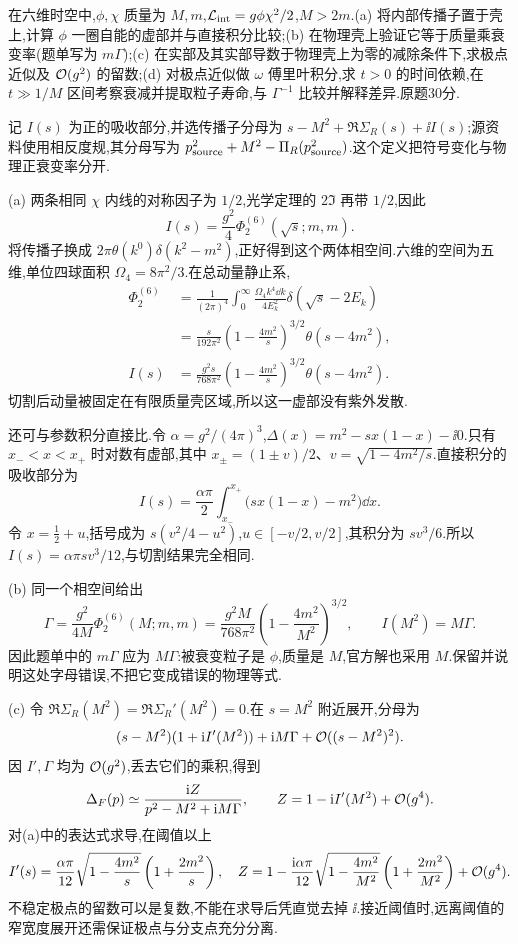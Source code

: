 \begin{exercise}
在六维时空中,$\phi,\chi$ 质量为 $M,m$,$\mathcal L_{\rm int}=g\phi\chi^2/2$,$M>2m$.(a) 将内部传播子置于壳上,计算 $\phi$ 一圈自能的虚部并与直接积分比较;(b) 在物理壳上验证它等于质量乘衰变率(题单写为 $m\Gamma$);(c) 在实部及其实部导数于物理壳上为零的减除条件下,求极点近似及 $\mathcal O(g^2)$ 的留数;(d) 对极点近似做 $\omega$ 傅里叶积分,求 $t>0$ 的时间依赖,在 $t\gg 1/M$ 区间考察衰减并提取粒子寿命,与 $\Gamma^{-1}$ 比较并解释差异.原题30分.
\end{exercise}
\begin{solution}
记 $I(s)$ 为正的吸收部分,并选传播子分母为 $s-M^2+\Re\Sigma_R(s)+\ii I(s)$;源资料使用相反度规,其分母写为 $p_{\rm source}^2+M^2-\Pi_R(p_{\rm source}^2)$.这个定义把符号变化与物理正衰变率分开.

(a) 两条相同 $\chi$ 内线的对称因子为 $1/2$,光学定理的 $2\Im$ 再带 $1/2$,因此
\[
I(s)=\frac{g^2}{4}\Phi_2^{(6)}(\sqrt s;m,m).
\]
将传播子换成 $2\pi\theta(k^0)\delta(k^2-m^2)$,正好得到这个两体相空间.六维的空间为五维,单位四球面积 $\Omega_4=8\pi^2/3$.在总动量静止系,
\begin{align*}
\Phi_2^{(6)}&=\frac1{(2\pi)^4}\int_0^\infty
\frac{\Omega_4k^4\dd k}{4E_k^2}\delta(\sqrt s-2E_k)\\
&=\frac{s}{192\pi^2}\left(1-\frac{4m^2}{s}\right)^{3/2}
\theta(s-4m^2),\\
I(s)&=\frac{g^2s}{768\pi^2}\left(1-\frac{4m^2}{s}\right)^{3/2}
\theta(s-4m^2).
\end{align*}
切割后动量被固定在有限质量壳区域,所以这一虚部没有紫外发散.

还可与参数积分直接比.令 $\alpha=g^2/(4\pi)^3$,$\Delta(x)=m^2-sx(1-x)-\ii0$.只有 $x_-<x<x_+$ 时对数有虚部,其中 $x_\pm=(1\pm v)/2$、$v=\sqrt{1-4m^2/s}$.直接积分的吸收部分为
\[
I(s)=\frac{\alpha\pi}{2}\int_{x_-}^{x_+}
\bigl(sx(1-x)-m^2\bigr)\dd x.
\]
令 $x=\frac12+u$,括号成为 $s(v^2/4-u^2)$,$u\in[-v/2,v/2]$,其积分为 $sv^3/6$.所以 $I(s)=\alpha\pi sv^3/12$,与切割结果完全相同.

(b) 同一个相空间给出
\[
\Gamma=\frac{g^2}{4M}\Phi_2^{(6)}(M;m,m)
=\frac{g^2M}{768\pi^2}\left(1-\frac{4m^2}{M^2}\right)^{3/2},
\qquad I(M^2)=M\Gamma.
\]
因此题单中的 $m\Gamma$ 应为 $M\Gamma$:被衰变粒子是 $\phi$,质量是 $M$,官方解也采用 $M$.保留并说明这处字母错误,不把它变成错误的物理等式.

(c) 令 $\Re\Sigma_R(M^2)=\Re\Sigma_R'(M^2)=0$.在 $s=M^2$ 附近展开,分母为
\[
(s-M^2)(1+\mathrm i I'(M^2))+\mathrm i M\Gamma+\mathcal O((s-M^2)^2).
\]
因 $I',\Gamma$ 均为 $\mathcal O(g^2)$,丢去它们的乘积,得到
\[
\Delta_F(p)\simeq\frac{\mathrm i Z}{p^2-M^2+\mathrm i M\Gamma},\qquad
Z=1-\mathrm i I'(M^2)+\mathcal O(g^4).
\]
对(a)中的表达式求导,在阈值以上
\[
I'(s)=\frac{\alpha\pi}{12}\sqrt{1-\frac{4m^2}{s}}
\left(1+\frac{2m^2}{s}\right),
\quad
Z=1-\frac{\mathrm i\alpha\pi}{12}
\sqrt{1-\frac{4m^2}{M^2}}
\left(1+\frac{2m^2}{M^2}\right)+\mathcal O(g^4).
\]
不稳定极点的留数可以是复数,不能在求导后凭直觉去掉 $\ii$.接近阈值时,远离阈值的窄宽度展开还需保证极点与分支点充分分离.


\end{solution}
